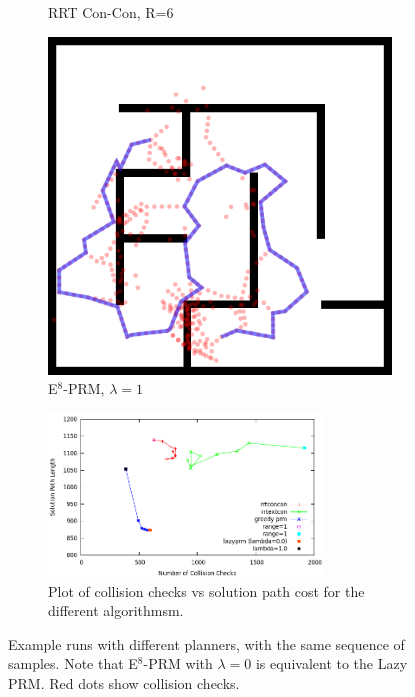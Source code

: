 \begin{figure}
\begin{subfigure}[b]{0.3\textwidth}
      \caption{RRT Con-Con, R=6}
   \end{subfigure}%
   \quad
   \begin{subfigure}[b]{0.3\textwidth}
      \includegraphics[width=\textwidth]{figs/compare-2d-rrtc1-checkmask-l10-s1.png}
      \caption{E$^8$-PRM, $\lambda=1$}
   \end{subfigure}%
   \vspace{0.05in}
   \begin{subfigure}[b]{\textwidth}
      \centering
      \includegraphics[width=0.8\textwidth]{figs/compare-2d-rrtc1-medians.png}
      \caption{Plot of collision checks vs solution path cost for the
         different algorithmsm.}
   \end{subfigure}%
   \caption{Example runs with different planners,
      with the same sequence of samples.
      Note that E$^8$-PRM with $\lambda=0$ is equivalent to the Lazy PRM.
      Red dots show collision checks.}
   \label{fig:compare-2d-rrtc1-vis}
\end{figure}

